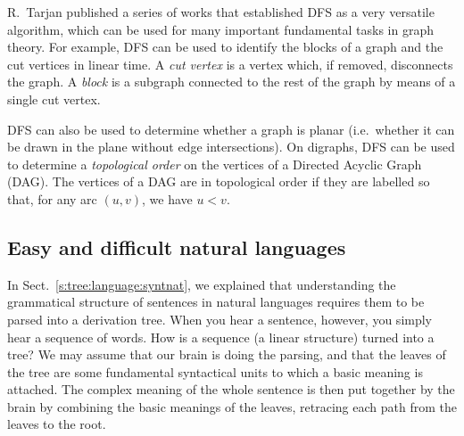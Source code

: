 \documentclass[a4paper]{book}
\theoremstyle{changebreak}                %
\begin{document}
R.~Tarjan published a series of works that
established DFS as a very versatile algorithm, which can be used for
many important fundamental tasks in graph theory. For example, DFS can
be used to identify the blocks of a graph and the
cut vertices in linear time. A {\it cut vertex} is a
vertex which, if removed, disconnects the graph. A {\it block} is a
subgraph connected to the rest of the graph by means of a single cut
vertex. 

DFS can also be used to determine whether a graph is
planar (i.e.~whether it can be drawn in the plane
without edge intersections). On digraphs, DFS
can be used to determine a {\it topological
  order} on the vertices of a Directed
Acyclic Graph (DAG). The vertices of
a DAG are in topological order if they are labelled so that, for any
arc $(u,v)$, we have $u<v$.

\subsection{Easy and difficult natural languages}
In Sect.~\ref{s:tree:language:syntnat}, we explained that
understanding the grammatical structure of
sentences in natural
languages requires them to be parsed into a
derivation tree. When you hear a sentence,
however, you simply hear a sequence of
words. How is a sequence (a linear structure) turned into
a tree? We may assume that our brain is doing the
parsing, and that the leaves of the tree are some
fundamental syntactical units to which a basic meaning is
attached. The complex meaning of the whole sentence is then put
together by the brain by combining the basic meanings of the leaves,
retracing each path from the leaves to the
root.
\end{document}
